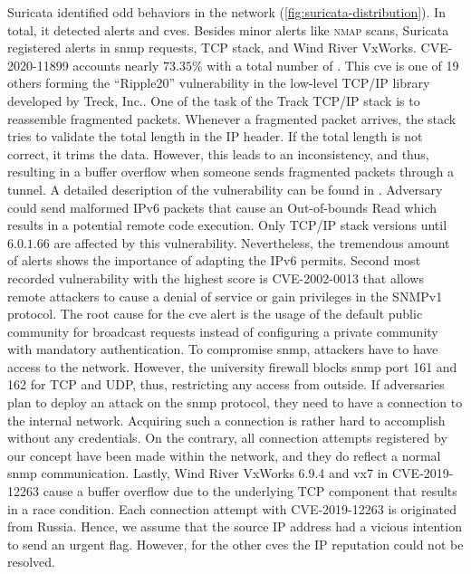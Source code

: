 Suricata identified odd behaviors in the network (\autoref{fig:suricata-distribution}).
In total, it detected  alerts and \acsp{cve}.
Besides minor alerts like \textsc{nmap} scans, Suricata registered alerts in \ac{snmp} requests, TCP stack, and Wind River VxWorks.
CVE-2020-11899 \cite{CVE-2020-11899} accounts nearly $73.35\%$ with a total number of .
This \acs{cve} is one of 19 others forming the \enquote{Ripple20} vulnerability in the low-level TCP/IP library developed by Treck, Inc..
One of the task of the Track TCP/IP stack is to reassemble fragmented packets.
Whenever a fragmented packet arrives, the stack tries to validate the total length in the IP header.
If the total length is not correct, it trims the data.
However, this leads to an inconsistency, and thus, resulting in a buffer overflow when someone sends fragmented packets through a tunnel.
A detailed description of the vulnerability can be found in \cite{ripple20}.
Adversary could send malformed IPv6 packets that cause an Out-of-bounds Read which results in a potential remote code execution.
Only TCP/IP stack versions until $6.0.1.66$ are affected by this vulnerability.
Nevertheless, the tremendous amount of alerts shows the importance of adapting the IPv6 permits.
Second most recorded vulnerability with the highest score is CVE-2002-0013 \cite{CVE-2002-0013} that allows remote attackers to cause a denial of service or gain privileges in the SNMPv1 protocol.
The root cause for the \acs{cve} alert is the usage of the default public community for broadcast requests instead of configuring a private community with mandatory authentication.
To compromise \ac{snmp}, attackers have to have access to the network.
However, the university firewall blocks \ac{snmp} port 161 and 162 for TCP and UDP, thus, restricting any access from outside.
If adversaries plan to deploy an attack on the \ac{snmp} protocol, they need to have a connection to the internal network.
Acquiring such a connection is rather hard to accomplish without any credentials.
On the contrary, all connection attempts registered by our concept have been made within the network, and they do reflect a normal \ac{snmp} communication.
Lastly, Wind River VxWorks 6.9.4 and vx7 in CVE-2019-12263 \cite{CVE-2019-12263} cause a buffer overflow due to the underlying TCP component that results in a race condition.
Each connection attempt with CVE-2019-12263 is originated from Russia.
Hence, we assume that the source IP address had a vicious intention to send an urgent flag.
However, for the other \acsp{cve} the IP reputation could not be resolved.

